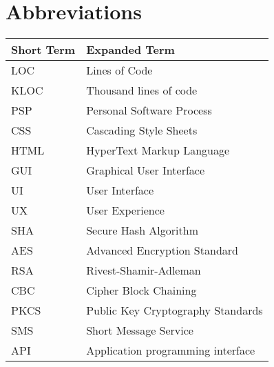 \chapter{Abbreviations}




\begin{tabular}{p{40mm}|p{100mm}}
	\textbf{Short Term}&\textbf{Expanded Term}\\
	\hline
	LOC		&	Lines of Code\\
	KLOC	&	Thousand lines of code\\
	PSP		& 	Personal Software Process\\
	CSS 		& Cascading Style Sheets\\
	HTML 	& HyperText Markup Language\\
	GUI		& Graphical User Interface\\
	UI			& User Interface\\
	UX 		& User Experience\\
	SHA 		& Secure Hash Algorithm\\
	AES		& Advanced Encryption Standard\\
	RSA		& Rivest-Shamir-Adleman\\
	CBC 		& Cipher Block Chaining\\
	PKCS 	& Public Key Cryptography Standards\\
	SMS 		& Short Message Service\\
	API		& Application programming interface\\
\end{tabular}